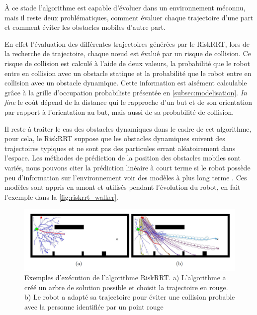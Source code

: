 À ce stade l'algorithme est capable d'évoluer dans un environnement méconnu, mais il reste deux problématiques, comment évaluer chaque trajectoire d'une part et comment éviter les obstacles mobiles d'autre part.

En effet l'évaluation des différentes trajectoires générées par le RiskRRT, lors de la recherche de trajectoire, chaque nœud est évalué par un risque de collision. Ce risque de collision est calculé à l'aide de deux valeurs, la probabilité que le robot entre en collision avec un obstacle statique et la probabilité que le robot entre en collision avec un obstacle dynamique. Cette information est aisément calculable grâce à la grille d'occupation probabiliste présentée en \autoref{subsec:modelisation}. \textit{In fine} le coût dépend de la distance qui le rapproche d'un but et de son orientation par rapport à l'orientation au but, mais aussi de sa probabilité de collision. 

Il reste à traiter le cas des obstacles dynamiques dans le cadre de cet algorithme, pour cela, le RiskRRT suppose que les obstacles dynamiques suivent des trajectoires typiques et ne sont pas des particules errant aléatoirement dans l'espace. Les méthodes de prédiction de la position des obstacles mobiles sont variés, nous pouvons citer la prédiction linéaire à court terme \cite{fulgenzi_probabilistic_2009} si le robot possède peu d'information sur l'environnement voir des modèles à plus long terme \cite{govea_incremental_2007}. Ces modèles sont appris en amont et utilisés pendant l'évolution du robot, \cite{spalanzani_contribution_2015} en fait l'exemple dans la \autoref{fig:riskrrt_walker}.

\begin{figure}
    \centering
    \includegraphics[width =\textwidth]{Rapport/images/riskrrt_walker.png}
    \caption{Exemples d'exécution de l'algorithme RiskRRT. a) L'algorithme a créé un arbre de solution possible et choisit la trajectoire en rouge. b) Le robot a adapté sa trajectoire pour éviter une collision probable avec la personne identifiée par un point rouge}
    \label{fig:riskrrt_walker}
\end{figure}


